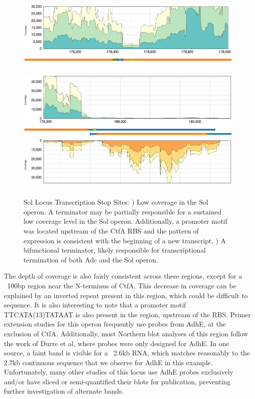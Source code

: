 \begin{figure}
{\includegraphics[width=\textwidth,height=1.5in]{images/Assembly/Sol/Sol-AdhE-terminator.png}
\label{fig:3a}}
{\includegraphics[width=\textwidth,height=2.5in]{images/Assembly/Sol/Sol-bifunctional-terminator}
\label{fig:3b}}
\caption{Sol Locus Transcription Stop Sites: ) Low coverage in the Sol operon. A terminator may be partially responsible for a sustained low coverage level in the Sol operon. Additionally, a promoter motif was located upstream of the CtfA RBS and the pattern of expression is consistent with the beginning of a new transcript. ) A bifunctional terminator, likely responsible for transcriptional termination of both Adc and the Sol operon. }
\end{figure}

The depth of coverage is also fairly consistent across these regions, except for a ~100bp region near the N-terminus of CtfA. This decrease in coverage can be explained by an inverted repeat present in this region, which could be difficult to sequence. It is also interesting to note that a promoter motif TTCATA(13)TATAAT is also present in the region, upstream of the RBS. Primer extension studies for this operon frequently use probes from AdhE, at the exclusion of CtfA. Additionally, most Northern blot analyses of this region follow the work of Durre et al, where probes were only designed for AdhE. In one source, a faint band is visible for a ~2.6kb RNA, which matches reasonably to the 2.7kb continuous sequence that we observe for AdhE in this example. Unfortunately, many other studies of this locus use AdhE probes exclusively and/or have sliced or semi-quantified their blots for publication, preventing further investigation of alternate bands.


